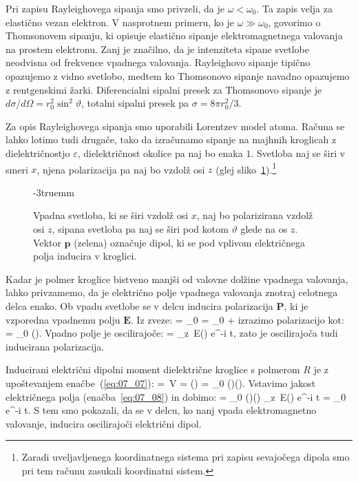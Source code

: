 \begin{remark}
Pri zapisu Rayleighovega sipanja smo privzeli, da je $\omega < \omega_0$. Ta zapis
velja za elastično vezan elektron. V nasprotnem primeru, ko je $\omega \gg \omega_0$, 
govorimo o Thomsonovem sipanju, ki opisuje elastično sipanje elektromagnetnega valovanja 
na prostem elektronu. Zanj je značilno, da je intenziteta sipane svetlobe neodvisna 
od frekvence vpadnega valovanja. Rayleighovo sipanje tipično opazujemo z vidno
svetlobo, medtem ko Thomsonovo sipanje navadno opazujemo z rentgenskimi žarki. Diferencialni
sipalni presek za Thomsonovo sipanje je $d\sigma/d\Omega = r_0^2 \sin^2\vartheta$, 
totalni sipalni presek pa $\sigma = 8 \pi r_0^2/3$.
\end{remark}



Za opis Rayleighovega sipanja smo uporabili Lorentzev model atoma. Računa se lahko
lotimo tudi drugače, tako da izračunamo sipanje na majhnih kroglicah z 
dielektričnostjo $\varepsilon$, dielektričnost 
okolice pa naj bo enaka $1$. Svetloba naj se širi v smeri
$x$, njena polarizacija pa naj bo vzdolž osi $z$ 
(glej sliko~\ref{fig:07_koor}).\footnote{Zaradi uveljavljenega koordinatnega sistema
pri zapisu sevajočega dipola smo pri tem računu zasukali koordinatni sistem.}
\begin{figure}[!h]
\centering
\def\svgwidth{80truemm} 

\caption{Vpadna svetloba, ki se širi vzdolž osi $x$, naj bo polarizirana vzdolž
osi $z$, sipana svetloba pa naj se širi pod kotom $\vartheta$ glede na os $z$. Vektor 
$\mathbf{p}$ (zelena) označuje dipol, ki se pod vplivom električnega polja inducira v kroglici.}
\label{fig:07_koor}
\vglue-3truemm
\end{figure}

Kadar je polmer kroglice bistveno manjši od
valovne dolžine vpadnega valovanja, lahko privzamemo, da je električno polje 
vpadnega valovanja znotraj celotnega delca enako. 
Ob vpadu svetlobe  se v delcu inducira polarizacija $\mathbf{P}$, ki je 
vzporedna vpadnemu polju $\mathbf{E}$. Iz zveze:
\beq
{} = \varepsilon \varepsilon_0  = \varepsilon_0  + 
\label{eq:07_06}
\eeq
izrazimo polarizacijo kot:
\beq
{} = \varepsilon_0 ().
\label{eq:07_07}
\eeq
Vpadno polje je oscilirajoče:
\beq
{} = _z\, E() e^{-i \omega t},
\label{eq:07_08}
\eeq
zato je oscilirajoča tudi inducirana polarizacija. 

Inducirani električni dipolni moment dielektrične kroglice s polmerom $R$ je
z upoštevanjem enačbe~(\ref{eq:07_07}): 
\beq
{} = \,V = \left(\right) = 
\varepsilon_0 ()\left(\right).
\label{eq:07_09}
\eeq
Vstavimo jakost električnega
polja (enačba~\ref{eq:07_08}) in dobimo:
\beq
{} = 
\varepsilon_0 ()\left(\right)
_z\, E() e^{-i \omega t} = _0\,e^{-i \omega t}.
\label{eq:07_09a}
\eeq
S tem smo pokazali, da se v delcu, ko nanj vpada elektromagnetno valovanje, 
inducira oscilirajoči električni dipol. 

